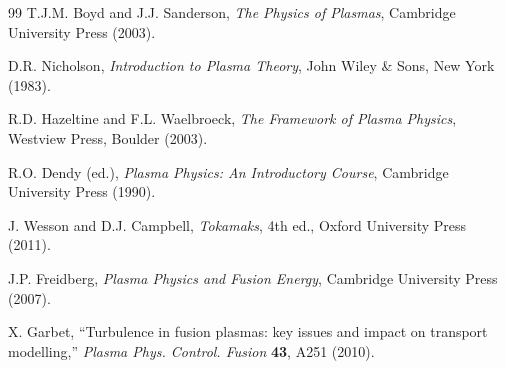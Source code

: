 \documentclass[11pt,a4paper]{article}
\begin{document}
\begin{thebibliography}{99}
T.J.M. Boyd and J.J. Sanderson, \textit{The Physics of Plasmas}, Cambridge University Press (2003).

D.R. Nicholson, \textit{Introduction to Plasma Theory}, John Wiley \& Sons, New York (1983).

R.D. Hazeltine and F.L. Waelbroeck, \textit{The Framework of Plasma Physics}, Westview Press, Boulder (2003).

R.O. Dendy (ed.), \textit{Plasma Physics: An Introductory Course}, Cambridge University Press (1990).

J. Wesson and D.J. Campbell, \textit{Tokamaks}, 4th ed., Oxford University Press (2011).

J.P. Freidberg, \textit{Plasma Physics and Fusion Energy}, Cambridge University Press (2007).

X. Garbet, ``Turbulence in fusion plasmas: key issues and impact on transport modelling,'' \textit{Plasma Phys. Control. Fusion} \textbf{43}, A251 (2010).

\end{thebibliography}
\end{document}
